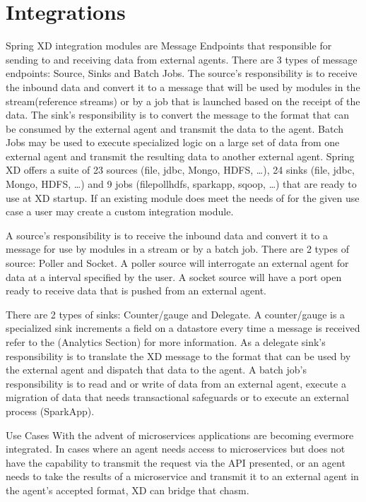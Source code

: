 \section{Integrations}
Spring XD integration modules are Message Endpoints \cite{enterprise-inetgration-pattern} that responsible for sending to and receiving data from external agents.  There are 3 types of message endpoints: Source, Sinks and Batch Jobs.  The source's responsibility is to receive the inbound data and convert it to a message that will be used by modules in the stream(reference streams) or by a job that is launched based on the receipt of the data.  The sink's responsibility is to convert the message to the format that can be consumed by the external agent and transmit the data to the agent.   Batch Jobs may be used to execute specialized logic on a large set of data from one external agent and transmit the resulting data to another external agent.  Spring XD offers a suite of 23 sources (file, jdbc, Mongo, HDFS, \ldots), 24 sinks (file, jdbc, Mongo, HDFS, \ldots) and 9 jobs (filepollhdfs, sparkapp, sqoop, \ldots)  that are ready to use at XD startup.  
If an existing module does meet the needs of for the given use case a user may create a custom integration module.\par
A source's responsibility is to receive the inbound data and convert it to a message for use by modules in a stream or by a batch job.  There are 2 types of source: Poller and Socket.  A poller source will interrogate an external agent for data at a interval specified by the user.  A socket source will have a port open ready to receive data that is pushed from an external agent.  \par
 There are 2 types of sinks: Counter/gauge and Delegate.  A counter/gauge is a specialized sink increments a field on a datastore every time a message is received refer to the (Analytics Section) for more information.  As a delegate sink's responsibility is to translate the XD message to the format that can be used by the external agent and dispatch that data to the agent.  
	A batch job's responsibility is to read and or write of data from an external agent, execute a migration of data that needs transactional safeguards or to execute an external process (SparkApp). \par
Use Cases 
With the advent of microservices \cite{microservices-pattern} applications are becoming evermore integrated.  In cases where an agent needs access to microservices but does not have the capability to transmit the request via the API presented, or an agent needs to take the results of a microservice and transmit it to  an external agent in the agent's accepted format, XD can bridge that chasm. 
